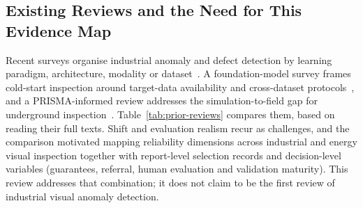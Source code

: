 \documentclass[journal]{IEEEtran}
\begin{document}
\subsection{Existing Reviews and the Need for This Evidence Map}
Recent surveys organise industrial anomaly and defect detection by learning paradigm, architecture, modality or dataset~\cite{liu2024deep,li2025survey,cao2024survey,alzarooni2025anomaly,lin2025survey,diers2023survey}. A foundation-model survey frames cold-start inspection around target-data availability and cross-dataset protocols~\cite{tan2026foundation}, and a PRISMA-informed review addresses the simulation-to-field gap for underground inspection~\cite{zambuk2026bridging}. Table~\ref{tab:prior-reviews} compares them, based on reading their full texts. Shift and evaluation realism recur as challenges, and the comparison motivated mapping reliability dimensions across industrial and energy visual inspection together with report-level selection records and decision-level variables (guarantees, referral, human evaluation and validation maturity). This review addresses that combination; it does not claim to be the first review of industrial visual anomaly detection.
\end{document}
